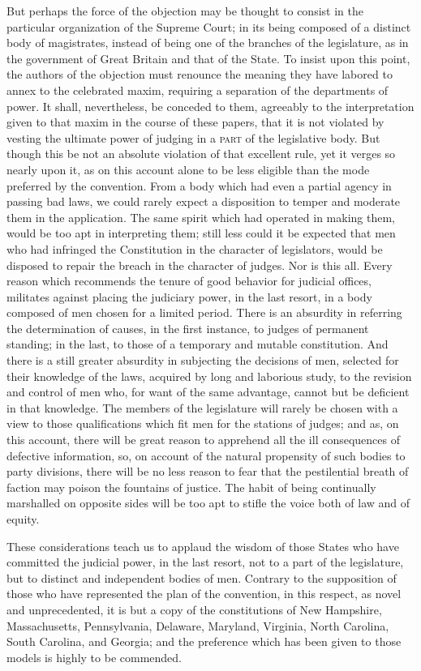 But perhaps the force of the objection may be thought to consist in the particular organization of the Supreme Court; in its being composed of a distinct body of magistrates, instead of being one of the branches of the legislature, as in the government of Great Britain and that of the State. To insist upon this point, the authors of the objection must renounce the meaning they have labored to annex to the celebrated maxim, requiring a separation of the departments of power. It shall, nevertheless, be conceded to them, agreeably to the interpretation given to that maxim in the course of these papers, that it is not violated by vesting the ultimate power of judging in a \textsc{part} of the legislative body. But though this be not an absolute violation of that excellent rule, yet it verges so nearly upon it, as on this account alone to be less eligible than the mode preferred by the convention. From a body which had even a partial agency in passing bad laws, we could rarely expect a disposition to temper and moderate them in the application. The same spirit which had operated in making them, would be too apt in interpreting them; still less could it be expected that men who had infringed the Constitution in the character of legislators, would be disposed to repair the breach in the character of judges. Nor is this all. Every reason which recommends the tenure of good behavior for judicial offices, militates against placing the judiciary power, in the last resort, in a body composed of men chosen for a limited period. There is an absurdity in referring the determination of causes, in the first instance, to judges of permanent standing; in the last, to those of a temporary and mutable constitution. And there is a still greater absurdity in subjecting the decisions of men, selected for their knowledge of the laws, acquired by long and laborious study, to the revision and control of men who, for want of the same advantage, cannot but be deficient in that knowledge. The members of the legislature will rarely be chosen with a view to those qualifications which fit men for the stations of judges; and as, on this account, there will be great reason to apprehend all the ill consequences of defective information, so, on account of the natural propensity of such bodies to party divisions, there will be no less reason to fear that the pestilential breath of faction may poison the fountains of justice. The habit of being continually marshalled on opposite sides will be too apt to stifle the voice both of law and of equity.

These considerations teach us to applaud the wisdom of those States who have committed the judicial power, in the last resort, not to a part of the legislature, but to distinct and independent bodies of men. Contrary to the supposition of those who have represented the plan of the convention, in this respect, as novel and unprecedented, it is but a copy of the constitutions of New Hampshire, Massachusetts, Pennsylvania, Delaware, Maryland, Virginia, North Carolina, South Carolina, and Georgia; and the preference which has been given to those models is highly to be commended.

